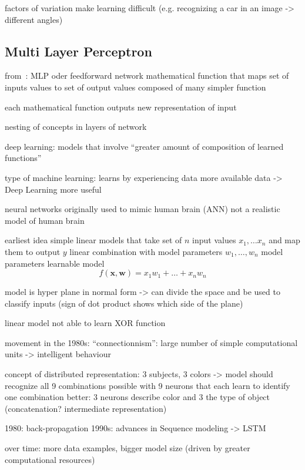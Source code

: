 factors of variation make learning difficult (e.g. recognizing a car in an image -> different angles)

\subsection{Multi Layer Perceptron}\label{subsec:multi-layer-perceptron}
from~\autocite{Goodfellow-et-al-2016}:
MLP oder feedforward network
mathematical function that maps set of inputs values to set of output values
composed of many simpler function

each mathematical function outputs new representation of input

nesting of concepts in layers of network

deep learning: models that involve \enquote{greater amount of composition of learned functions}

type of machine learning: learns by experiencing data
more available data -> Deep Learning more useful

neural networks originally used to mimic human brain (ANN)
not a realistic model of human brain

earliest idea simple linear models that take set of $n$ input values $x_1, \dots x_n$ and map them to output $y$
linear combination with model parameters $w_1, \dots, w_n$
model parameters learnable
model \[
          f(\boldsymbol{x}, \boldsymbol{w}) = x_1 w_1 + \dots + x_n w_n
\]

model is hyper plane in normal form -> can divide the space and be used to classify inputs
(sign of dot product shows which side of the plane) %

linear model not able to learn XOR function


movement in the 1980s: \enquote{connectionnism}:
large number of simple computational units -> intelligent behaviour

concept of distributed representation:
3 subjects, 3 colors -> model should recognize all 9 combinations
possible with 9 neurons that each learn to identify one combination
better: 3 neurons describe color and 3 the type of object (concatenation? intermediate representation)

1980: back-propagation
1990s: advances in Sequence modeling -> LSTM

over time: more data examples, bigger model size (driven by greater computational resources)



